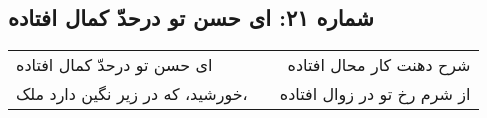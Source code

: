 \begin{center}
\section*{شماره ۲۱: ای حسن تو درحدّ کمال افتاده}
\label{sec:021}
\begin{longtable}{l p{0.5cm} r}
ای حسن تو درحدّ کمال افتاده
&&
شرح دهنت کار محال افتاده
\\
خورشید، که در زیر نگین دارد ملک،
&&
از شرم رخ تو در زوال افتاده
\\
\end{longtable}
\end{center}
